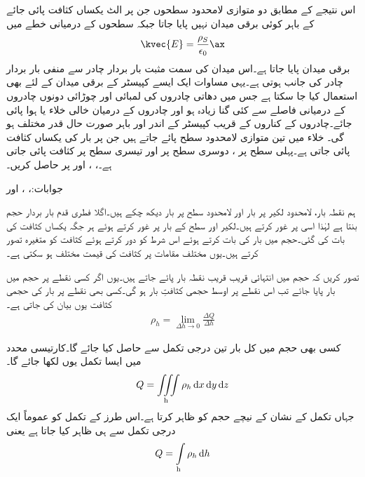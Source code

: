 اس نتیجے کے مطابق دو متوازی لامحدود سطحوں جن پر الٹ یکساں کثافت پائی جائے کے باہر کوئی برقی میدان نہیں پایا جاتا جبکہ سطحوں کے درمیانی خطے میں
\begin{align}\label{مساوات_کولمب_متوازی_چادر_کپیسٹر_کا_میدان}
\kvec{E}=\frac{\rho_S}{\epsilon_0}\ax
\end{align}
برقی میدان پایا جاتا ہے۔اس میدان کی سمت مثبت بار بردار چادر سے منفی بار بردار چادر کی جانب ہوتی ہے۔یہی مساوات ایک ایسے کپیسٹر کے برقی میدان کے لئے بھی استعمال کیا جا سکتا ہے  جس میں دھاتی چادروں  کی لمبائی اور چوڑائی دونوں چادروں کے درمیانی فاصلے سے کئی گنا زیادہ ہو اور چادروں کے درمیان خالی خلاء یا ہوا پائی جائے۔چادروں کے کناروں کے قریب کپیسٹر کے اندر اور باہر صورت حال قدر مختلف ہو گی۔ 
خلاء میں تین متوازی لامحدود سطح پائے جاتے ہیں جن پر بار کی یکساں کثافت پائی جاتی ہے۔پہلی سطح  پر  ، دوسری سطح   پر   اور تیسری سطح  پر   کثافت پائی جاتی ہے۔، ، اور  پر  حاصل کریں۔

جوابات:، ،  اور  

ہم نقطہ بار، لامحدود لکیر پر بار اور لامحدود سطح پر بار دیکھ چکے ہیں۔اگلا فطری قدم  بار بردار حجم بنتا ہے لہٰذا اسی پر غور کرتے ہیں۔لکیر اور سطح کے بار  پر غور کرتے ہوئے ہر جگہ یکساں کثافت کی بات کی گئی۔حجم میں بار کی بات کرتے ہوئے اس شرط کو دور کرتے ہوئے کثافت کو متغیرہ تصور کرتے ہیں۔یوں مختلف مقامات پر کثافت کی قیمت مختلف ہو سکتی ہے۔

تصور کریں کہ حجم میں انتہائی قریب قریب نقطہ بار پائے جاتے ہیں۔یوں اگر کسی نقطے پر  حجم میں  بار پایا جائے تب اس نقطے پر اوسط حجمی کثافتِ بار  ہو گی۔کسی بھی نقطے پر بار کی حجمی  کثافت  یوں بیان کی جاتی ہے۔
\begin{align}
\rho_h=\lim_{\Delta h \to 0} \frac{\Delta Q}{\Delta h}
\end{align} 

کسی بھی حجم میں کل بار   تین درجی تکمل سے حاصل کیا جائے گا۔کارتیسی محدد میں ایسا تکمل یوں لکھا جائے گا۔
\begin{align}
Q=\iiint\limits_{\textrm{h}} \rho_h \dif x \dif y \dif z
\end{align}
جہاں تکمل کے نشان کے نیچے  حجم کو ظاہر کرتا ہے۔اس طرز کے تکمل کو عموماً ایک درجی تکمل سے ہی ظاہر کیا جاتا ہے یعنی
\begin{align}
Q=\int\limits_{\textrm{h}} \rho_h \dif h
\end{align}


